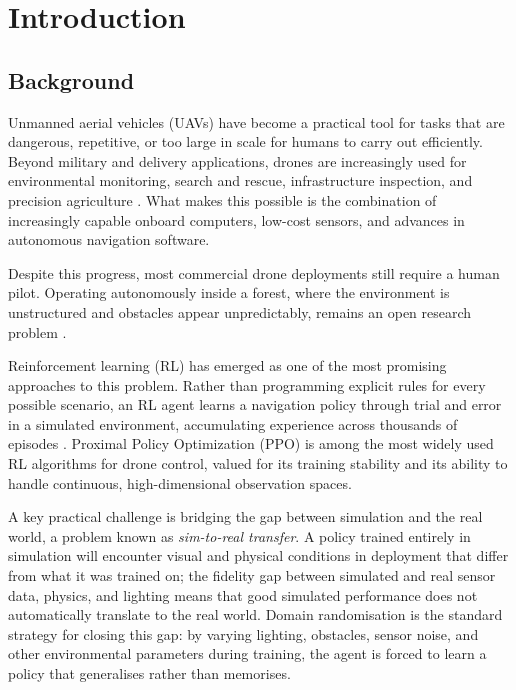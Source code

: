 \documentclass[../main.tex]{subfiles}
\begin{document}
\section{Introduction}
\justify

\subsection{Background}

Unmanned aerial vehicles (UAVs) have become a practical tool for tasks that are dangerous, repetitive, or too large in scale for humans to carry out efficiently. Beyond military and delivery applications, drones are increasingly used for environmental monitoring, search and rescue, infrastructure inspection, and precision agriculture \cite{Butt2024,Fu2024}. What makes this possible is the combination of increasingly capable onboard computers, low-cost sensors, and advances in autonomous navigation software.

Despite this progress, most commercial drone deployments still require a human pilot. Operating autonomously inside a forest, where the environment is unstructured and obstacles appear unpredictably, remains an open research problem \cite{Butt2024,Merei2025,Debnath2024}.

Reinforcement learning (RL) has emerged as one of the most promising approaches to this problem. Rather than programming explicit rules for every possible scenario, an RL agent learns a navigation policy through trial and error in a simulated environment, accumulating experience across thousands of episodes \cite{Fu2024,Schulman2017}. Proximal Policy Optimization (PPO) \cite{Schulman2017} is among the most widely used RL algorithms for drone control, valued for its training stability and its ability to handle continuous, high-dimensional observation spaces.

A key practical challenge is bridging the gap between simulation and the real world, a problem known as \textit{sim-to-real transfer}. A policy trained entirely in simulation will encounter visual and physical conditions in deployment that differ from what it was trained on; the fidelity gap between simulated and real sensor data, physics, and lighting means that good simulated performance does not automatically translate to the real world. Domain randomisation \cite{Loquercio2019,Zhao2020} is the standard strategy for closing this gap: by varying lighting, obstacles, sensor noise, and other environmental parameters during training, the agent is forced to learn a policy that generalises rather than memorises.
\end{document}
